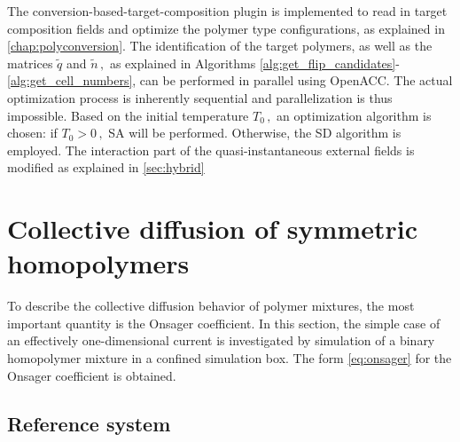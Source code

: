 \documentclass[bachelor,       %
               oneside,        %
               BCOR10mm,       %
               ngerman, english %
               ]{GAUBM}
\begin{document}
The conversion-based-target-composition plugin is implemented to read in target composition fields and optimize the polymer type configurations, as explained in \autoref{chap:polyconversion}. The identification of the target polymers, as well as the matrices $\tilde q$ and $\tilde n\,,$ as explained in Algorithms \ref{alg:get_flip_candidates}-\ref{alg:get_cell_numbers}, can be performed in parallel using OpenACC. The actual optimization process is inherently sequential and parallelization is thus impossible. Based on the initial temperature $T_0\,,$ an optimization algorithm is chosen: if $T_0>0\,,$ \ac{SA} will be performed. Otherwise, the \ac{SD} algorithm is employed. The interaction part of the quasi-instantaneous external fields is modified as explained in \autoref{sec:hybrid}


\chapter{Collective diffusion of symmetric homopolymers}
\label{chap:colldiff}

To describe the collective diffusion behavior of polymer mixtures, the most important quantity is the Onsager coefficient. In this section, the simple case of an effectively one-dimensional current is investigated by simulation of a binary homopolymer mixture in a confined simulation box. The form \autoref{eq:onsager} for the Onsager coefficient is obtained. 

\section{Reference system}
\end{document}
